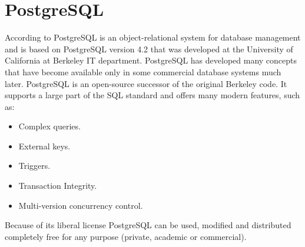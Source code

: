 \section{PostgreSQL}
\label{sec:postgres}





According to PostgreSQL is an object-relational system for database management and is based on
PostgreSQL version 4.2 that was developed at the University of California at Berkeley IT department.
PostgreSQL has developed many concepts that have become available only in some commercial database
systems much later. PostgreSQL is an open-source successor of the original Berkeley code. It supports a
large part of the SQL standard and offers many modern features, such as:
\begin{itemize}
    \item Complex queries.
    \item External keys.
    \item Triggers.
    \item Transaction Integrity.
    \item Multi-version concurrency control.
\end{itemize}
Because of its liberal license PostgreSQL can be used, modified and distributed completely free for any purpose
(private, academic or commercial).